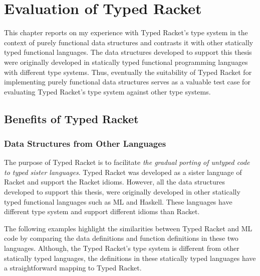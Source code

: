 \chapter{Evaluation of Typed Racket}

This chapter reports on my experience with Typed Racket's type system in
the context of purely functional data structures and contrasts it with
other statically typed functional languages. The data structures
developed to support this thesis were originally developed in statically
typed functional programming languages with different type
systems. Thus, eventually the suitability of Typed Racket for
implementing purely functional data structures serves as a valuable test
case for evaluating Typed Racket's type system against other type
systems.

\section{Benefits of Typed Racket}

\subsection*{Data Structures from Other Languages}
The purpose of Typed Racket is to facilitate \emph{the gradual porting
of untyped code to typed sister languages}. Typed Racket was developed
as a sister language of Racket and support the Racket idioms. However,
all the data structures developed to support this thesis, were
originally developed in other statically typed functional languages such
as ML and Haskell. These languages have different type system and
support different idioms than Racket.

The following examples highlight the similarities between Typed Racket
and ML code by comparing the data definitions and function definitions
in these two languages. Although, the Typed Racket's type system is
different from other statically typed languages, the definitions in
these statically typed languages have a straightforward mapping to Typed
Racket.

